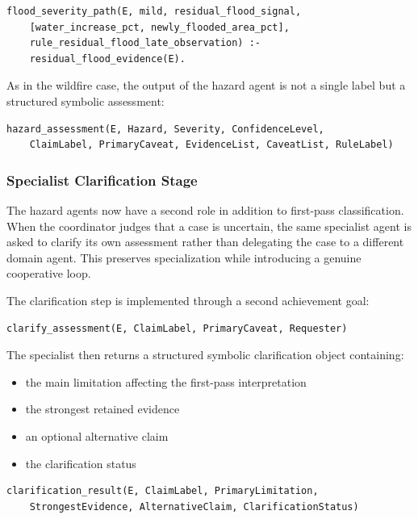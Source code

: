 \documentclass[11pt,a4paper]{article}
\begin{document}
\begin{lstlisting}
flood_severity_path(E, mild, residual_flood_signal,
    [water_increase_pct, newly_flooded_area_pct],
    rule_residual_flood_late_observation) :-
    residual_flood_evidence(E).
\end{lstlisting}

As in the wildfire case, the output of the hazard agent is not a single label but a structured symbolic assessment:

\begin{lstlisting}
hazard_assessment(E, Hazard, Severity, ConfidenceLevel,
    ClaimLabel, PrimaryCaveat, EvidenceList, CaveatList, RuleLabel)
\end{lstlisting}

\subsubsection{Specialist Clarification Stage}

The hazard agents now have a second role in addition to first-pass classification. When the coordinator judges that a case is uncertain, the same specialist agent is asked to clarify its own assessment rather than delegating the case to a different domain agent. This preserves specialization while introducing a genuine cooperative loop.

The clarification step is implemented through a second achievement goal:

\begin{lstlisting}
clarify_assessment(E, ClaimLabel, PrimaryCaveat, Requester)
\end{lstlisting}

The specialist then returns a structured symbolic clarification object containing:

\begin{itemize}
\item the main limitation affecting the first-pass interpretation
\item the strongest retained evidence
\item an optional alternative claim
\item the clarification status
\end{itemize}

\begin{lstlisting}
clarification_result(E, ClaimLabel, PrimaryLimitation,
    StrongestEvidence, AlternativeClaim, ClarificationStatus)
\end{lstlisting}
\end{document}
